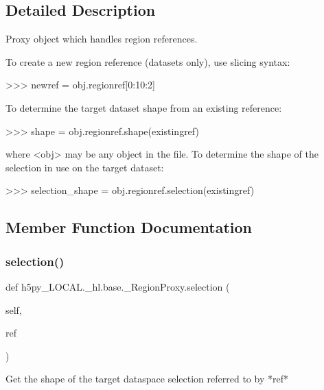 \subsection{Detailed Description}
\begin{DoxyVerb}    Proxy object which handles region references.

    To create a new region reference (datasets only), use slicing syntax:

        >>> newref = obj.regionref[0:10:2]

    To determine the target dataset shape from an existing reference:

        >>> shape = obj.regionref.shape(existingref)

    where <obj> may be any object in the file. To determine the shape of
    the selection in use on the target dataset:

        >>> selection_shape = obj.regionref.selection(existingref)
\end{DoxyVerb}
 

\subsection{Member Function Documentation}
\mbox{\label{classh5py__LOCAL_1_1__hl_1_1base_1_1__RegionProxy_a40cd1dbb42844bffac84c15482f763ce}} 
\subsubsection{\texorpdfstring{selection()}{selection()}}
{\footnotesize\ttfamily def h5py\+\_\+\+L\+O\+C\+A\+L.\+\_\+hl.\+base.\+\_\+\+Region\+Proxy.\+selection (\begin{DoxyParamCaption}\item[{}]{self,  }\item[{}]{ref }\end{DoxyParamCaption})}

\begin{DoxyVerb}Get the shape of the target dataspace selection referred to by *ref*
\end{DoxyVerb}
 \mbox{\label{classh5py__LOCAL_1_1__hl_1_1base_1_1__RegionProxy_ae8e1aa2336abe157428758c46581c70f}} 
